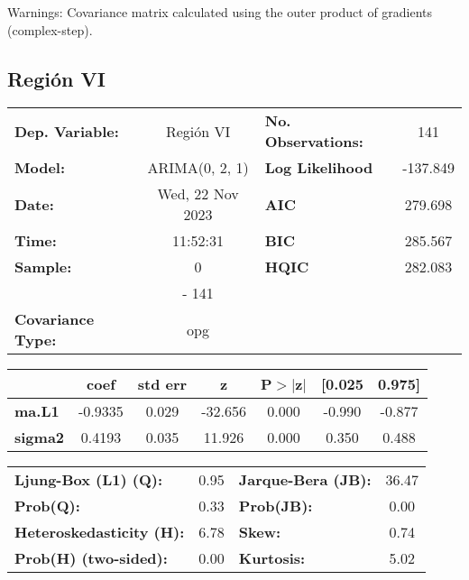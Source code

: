 \documentclass{article}%
\begin{document}
Warnings: \newline
 [1] Covariance matrix calculated using the outer product of gradients (complex-step).%
\subsection*{Región VI}%
\begin{center}
\begin{tabular}{lclc}
\toprule
\textbf{Dep. Variable:}          &    Región VI     & \textbf{  No. Observations:  } &    141      \\
\textbf{Model:}                  &  ARIMA(0, 2, 1)  & \textbf{  Log Likelihood     } &  -137.849   \\
\textbf{Date:}                   & Wed, 22 Nov 2023 & \textbf{  AIC                } &  279.698    \\
\textbf{Time:}                   &     11:52:31     & \textbf{  BIC                } &  285.567    \\
\textbf{Sample:}                 &        0         & \textbf{  HQIC               } &  282.083    \\
\textbf{}                        &       - 141      & \textbf{                     } &             \\
\textbf{Covariance Type:}        &       opg        & \textbf{                     } &             \\
\bottomrule
\end{tabular}
\begin{tabular}{lcccccc}
                & \textbf{coef} & \textbf{std err} & \textbf{z} & \textbf{P$> |$z$|$} & \textbf{[0.025} & \textbf{0.975]}  \\
\midrule
\textbf{ma.L1}  &      -0.9335  &        0.029     &   -32.656  &         0.000        &       -0.990    &       -0.877     \\
\textbf{sigma2} &       0.4193  &        0.035     &    11.926  &         0.000        &        0.350    &        0.488     \\
\bottomrule
\end{tabular}
\begin{tabular}{lclc}
\textbf{Ljung-Box (L1) (Q):}     & 0.95 & \textbf{  Jarque-Bera (JB):  } & 36.47  \\
\textbf{Prob(Q):}                & 0.33 & \textbf{  Prob(JB):          } &  0.00  \\
\textbf{Heteroskedasticity (H):} & 6.78 & \textbf{  Skew:              } &  0.74  \\
\textbf{Prob(H) (two-sided):}    & 0.00 & \textbf{  Kurtosis:          } &  5.02  \\
\bottomrule
\end{tabular}
\end{center}
\end{document}
